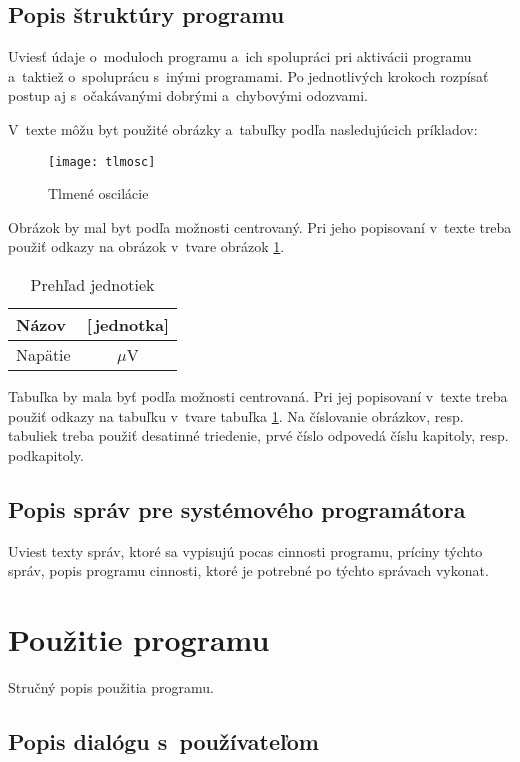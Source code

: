 \documentclass[a4paper]{feidippp}
\begin{document}
\subsection{Popis štruktúry programu}

Uviesť údaje o~moduloch  programu a~ich spolupráci pri aktivácii programu a~taktiež             o~spoluprácu s~inými programami. Po jednotlivých krokoch rozpísať postup aj s~očakávanými  dobrými a~chybovými odozvami.

V~texte môžu byt použité obrázky a~tabuľky  podľa nasledujúcich príkladov:

\begin{figure}[!ht]
\centering 
\texttt{[image: tlmosc]}
\caption{Tlmené oscilácie}\label{o:1}
\end{figure}

Obrázok by mal byt podľa možnosti centrovaný. Pri jeho popisovaní v~texte treba použiť odkazy na obrázok v~tvare obrázok \ref{o:1}.

\begin{table}[!ht]\caption{Prehľad jednotiek}\label{t:1}
\smallskip
\centering
\begin{tabular}{|l|c|} \hline
Názov	& [\,jednotka] \\ \hline
Napätie & $\mu$V \\ \hline
\end{tabular}	
\end{table}


Tabuľka by mala byť podľa možnosti centrovaná. Pri jej popisovaní v~texte treba použiť odkazy na tabuľku v~tvare tabuľka \ref{t:1}.
Na číslovanie obrázkov, resp. tabuliek treba použiť desatinné triedenie, prvé číslo odpovedá číslu kapitoly, resp. podkapitoly.


\subsection{Popis správ pre systémového programátora}

Uviest texty správ, ktoré sa vypisujú pocas cinnosti programu, príciny týchto správ, popis programu cinnosti, ktoré je potrebné po týchto správach vykonat.

\section{Použitie programu}
Stručný popis použitia programu.

\subsection{Popis dialógu s~používateľom}
\end{document}
